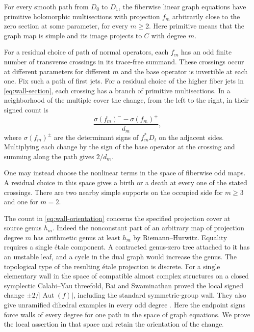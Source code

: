 \begin{theorem}\label{thm:walls}
For every smooth path from $D_0$ to $D_1$, the fiberwise linear graph
equations have primitive holomorphic multisections with projection
$f_m$ arbitrarily close to the zero section at some parameter, for
every $m\ge2$. Here primitive means that the graph map is simple and
its image projects to $C$ with degree $m$.

For a residual choice of path of normal operators, each $f_m$ has an
odd finite number of transverse crossings in its trace-free summand.
These crossings occur at different parameters for different $m$ and
the base operator is invertible at each one. Fix such a path of first
jets. For a residual choice of the higher fiber jets in
\eqref{eq:wall-section}, each crossing has a branch of primitive
multisections. In a neighborhood of the multiple cover the change,
from the left to the right, in their signed count is
\begin{equation}\label{eq:wall-orientation}
  \frac{\sigma(f_m)^- - \sigma(f_m)^+}{d_m},
\end{equation}
where $\sigma(f_m)^\pm$ are the determinant signs of $f_m^*D_t$ on
the adjacent sides. Multiplying each change by the sign of the base
operator at the crossing and summing along the path gives $2/d_m$.

One may instead choose the nonlinear terms in the space of fiberwise
odd maps. A residual choice in this space gives a birth or a death at
every one of the stated crossings. There are two nearby simple
supports on the occupied side for $m\ge3$ and one for $m=2$.
\end{theorem}

The count in \eqref{eq:wall-orientation} concerns the specified
projection cover at source genus $h_m$. Indeed the nonconstant part
of an arbitrary map of projection degree $m$ has arithmetic genus at
least $h_m$ by Riemann--Hurwitz. Equality requires a single \'etale
component. A contracted genus-zero tree attached to it has an unstable
leaf, and a cycle in the dual graph would increase the genus.
The topological type of the resulting \'etale projection is discrete.
For a single elementary wall in the space of compatible almost complex
structures on a closed symplectic Calabi--Yau threefold, Bai and
Swaminathan proved the local signed change $\pm2/|\operatorname{Aut}(f)|$,
including the standard symmetric-group wall. They also give unramified
dihedral examples in every odd degree \cite[Theorems~1.9 and~4.12,
Examples~4.3--4.4]{bai}. Here the endpoint
signs force walls of every degree for one path in the space of graph
equations. We prove the local assertion in that space and retain the
orientation of the change.


